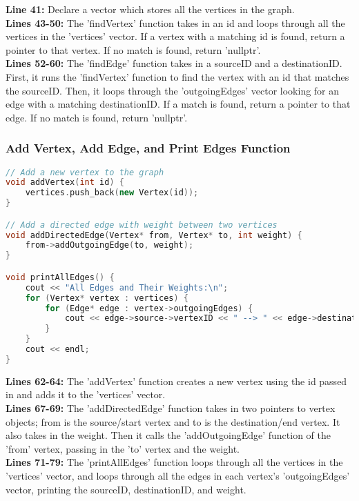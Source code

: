 \documentclass[letterpaper, 10pt,DIV=13]{scrartcl}
\numberwithin{equation}{section} %
\numberwithin{figure}{section} %
\numberwithin{table}{section} %
\begin{document}
\textbf{Line 41:}  Declare a vector which stores all the vertices in the graph. \\
\textbf{Lines 43-50:} The 'findVertex' function takes in an id and loops through all the vertices in the 'vertices' vector. If a vertex with a matching id is found, return a pointer to that vertex. If no match is found, return 'nullptr'. \\
\textbf{Lines 52-60:} The 'findEdge' function takes in a sourceID and a destinationID. First, it runs the 'findVertex' function to find the vertex with an id that matches the sourceID. Then, it loops through the 'outgoingEdges' vector looking for an edge with a matching destinationID. If a match is found, return a pointer to that edge. If no match is found, return 'nullptr'.

\subsubsection{Add Vertex, Add Edge, and Print Edges Function}
\begin{linenumbers}
\begin{lstlisting}[language=C++, caption={Add Vertex, Add Edge, and Print Edges Function}, label={code:example}]
// Add a new vertex to the graph
void addVertex(int id) {
    vertices.push_back(new Vertex(id));
}

// Add a directed edge with weight between two vertices
void addDirectedEdge(Vertex* from, Vertex* to, int weight) {
    from->addOutgoingEdge(to, weight);
}

void printAllEdges() {
    cout << "All Edges and Their Weights:\n";
    for (Vertex* vertex : vertices) {
        for (Edge* edge : vertex->outgoingEdges) {
            cout << edge->source->vertexID << " --> " << edge->destination->vertexID << " weight is " << edge->weight << endl;
        }
    }
    cout << endl;
}

\end{lstlisting}
\end{linenumbers}
\nolinenumbers

\textbf{Lines 62-64:} The 'addVertex' function creates a new vertex using the id passed in and adds it to the 'vertices' vector. \\
\textbf{Lines 67-69:} The 'addDirectedEdge' function takes in two pointers to vertex objects; from is the source/start vertex and to is the destination/end vertex. It also takes in the weight. Then it calls the 'addOutgoingEdge' function of the 'from' vertex, passing in the 'to' vertex and the weight. \\
\textbf{Lines 71-79:} The 'printAllEdges' function loops through all the vertices in the 'vertices' vector, and loops through all the edges in each vertex's 'outgoingEdges' vector, printing the sourceID, destinationID, and weight.
\end{document}
